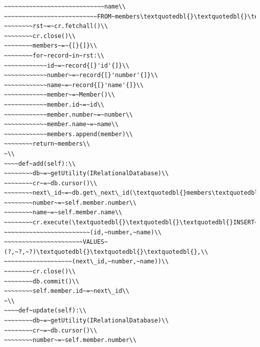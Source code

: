 \documentclass[a4paper,openany,twoside,draft]{book}
\begin{document}
\begin{verbatim}
~~~~~~~~~~~~~~~~~~~~~~~~~~~~name\\
~~~~~~~~~~~~~~~~~~~~~~~~~~FROM~members\textquotedbl{}\textquotedbl{}\textquotedbl{})\\
~~~~~~~~rst~=~cr.fetchall()\\
~~~~~~~~cr.close()\\
~~~~~~~~members~=~{[}{]}\\
~~~~~~~~for~record~in~rst:\\
~~~~~~~~~~~~id~=~record{[}'id'{]}\\
~~~~~~~~~~~~number~=~record{[}'number'{]}\\
~~~~~~~~~~~~name~=~record{[}'name'{]}\\
~~~~~~~~~~~~member~=~Member()\\
~~~~~~~~~~~~member.id~=~id\\
~~~~~~~~~~~~member.number~=~number\\
~~~~~~~~~~~~member.name~=~name\\
~~~~~~~~~~~~members.append(member)\\
~~~~~~~~return~members\\
~\\
~~~~def~add(self):\\
~~~~~~~~db~=~getUtility(IRelationalDatabase)\\
~~~~~~~~cr~=~db.cursor()\\
~~~~~~~~next\_id~=~db.get\_next\_id(\textquotedbl{}members\textquotedbl{})\\
~~~~~~~~number~=~self.member.number\\
~~~~~~~~name~=~self.member.name\\
~~~~~~~~cr.execute(\textquotedbl{}\textquotedbl{}\textquotedbl{}INSERT~INTO~members\\
~~~~~~~~~~~~~~~~~~~~~~~~(id,~number,~name)\\
~~~~~~~~~~~~~~~~~~~~~~VALUES~(?,~?,~?)\textquotedbl{}\textquotedbl{}\textquotedbl{},\\
~~~~~~~~~~~~~~~~~~~(next\_id,~number,~name))\\
~~~~~~~~cr.close()\\
~~~~~~~~db.commit()\\
~~~~~~~~self.member.id~=~next\_id\\
~\\
~~~~def~update(self):\\
~~~~~~~~db~=~getUtility(IRelationalDatabase)\\
~~~~~~~~cr~=~db.cursor()\\
~~~~~~~~number~=~self.member.number\\

\end{verbatim}
\end{document}
